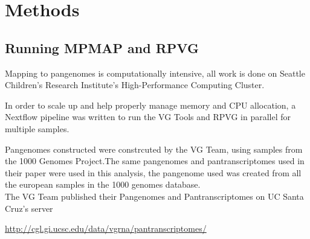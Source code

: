 \documentclass{article}
\begin{document}
\section{Methods}

\subsection{Running MPMAP and RPVG}

Mapping to pangenomes is computationally intensive, all work is done on Seattle
Children's Research Institute's High-Performance Computing Cluster. 

In order to scale up and help properly manage memory and CPU allocation, a Nextflow 
pipeline was written to run the VG Tools and RPVG in parallel for multiple samples.

\begin{figure}
  \centering


\end{figure}

Pangenomes constructed were constrcuted by the VG Team, using samples from the 1000 Genomes 
Project.The same pangenomes and pantranscriptomes used in their paper were
used in this analysis, the pangenome used was created from all the european 
samples in the 1000 genomes database.\\

The VG Team published their Pangenomes and Pantranscriptomes on UC Santa Cruz's server

\url{http://cgl.gi.ucsc.edu/data/vgrna/pantranscriptomes/}\\
\end{document}
